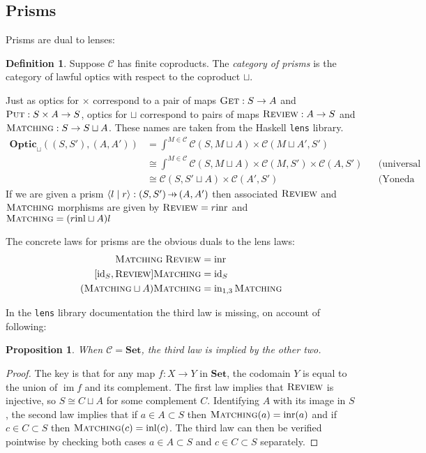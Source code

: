 \documentclass[11pt,letterpaper]{article}
\theoremstyle{plain}
\newtheorem{proposition}[theorem]{Proposition}
\theoremstyle{definition}
\newtheorem{definition}[theorem]{Definition}
\newcommand{\C}{\mathscr{C}}
\newcommand{\lenslib}{\texttt{lens}}
\newcommand{\Set}{\mathbf{Set}}
\newcommand{\Optic}{\mathbf{Optic}}
\newcommand{\id}{\mathrm{id}}
\newcommand{\inl}{\mathrm{inl}}
\newcommand{\inr}{\mathrm{inr}}
\DeclareMathOperator{\im}{im}
\newcommand{\rep}[2]{{\ensuremath \left\langle #1 \mid #2 \right\rangle}}
\newcommand{\fget}{\textsc{Get}}
\newcommand{\fput}{\textsc{Put}}
\newcommand{\freview}{\textsc{Review}}
\newcommand{\fmatching}{\textsc{Matching}}
\newcommand{\hto}{\ensuremath{\,\mathaccent\shortmid\rightarrow\,}}
\begin{document}
\subsection{Prisms}
Prisms are dual to lenses:

\begin{definition}
  Suppose $\C$ has finite coproducts. The \emph{category of prisms} is the category of lawful optics with respect to the coproduct $\sqcup$.
\end{definition}

Just as optics for $\times$ correspond to a pair of maps $\fget : S \to A$ and $\fput : S \times A \to S$, optics for $\sqcup$ correspond to pairs of maps $\freview : A \to S$ and $\fmatching : S \to S \sqcup A$. These names are taken from the Haskell \lenslib{} library.
\begin{align*}
  \Optic_\sqcup((S, S'), (A, A')) &= \int^{M \in \C} \C(S, M \sqcup A) \times \C(M \sqcup A', S') \\
                                  &\cong \int^{M \in \C} \C(S, M \sqcup A) \times \C(M, S') \times \C(A, S') && \text{(universal property of coproduct)} \\
                                  &\cong \C(S, S' \sqcup A) \times \C(A', S') && \text{(Yoneda reduction)}
\end{align*}
If we are given a prism $\rep{l}{r} : (S, S') \hto (A, A')$ then associated $\freview$ and $\fmatching$ morphisms are given by $\freview = r \inr$ and $\fmatching = (r\inl \sqcup A)l$

The concrete laws for prisms are the obvious duals to the lens laws:
\begin{align*}
  \fmatching \; \freview &= \inr \\
  [\id_S, \freview] \fmatching &= \id_S \\
  (\fmatching \sqcup A) \fmatching &= \mathrm{in}_{1,3} \, \fmatching
\end{align*}

In the \lenslib{} library documentation the third law is missing, on account of following:

\begin{proposition}
  When $\C = \Set$, the third law is implied by the other two.
\end{proposition}
\begin{proof}
  The key is that for any map $f : X \to Y$ in $\Set$, the codomain $Y$ is equal to the union of $\im f$ and its complement. The first law implies that $\freview$ is injective, so $S \cong C \sqcup A$ for some complement $C$. Identifying $A$ with its image in $S$, the second law implies that if $a\in A \subset S$ then $\fmatching(a) = \inr(a)$ and if $c\in C \subset S$ then $\fmatching(c) = \inl(c)$. The third law can then be verified pointwise by checking both cases $a\in A \subset S$ and $c\in C \subset S$ separately.
\end{proof}
\end{document}
